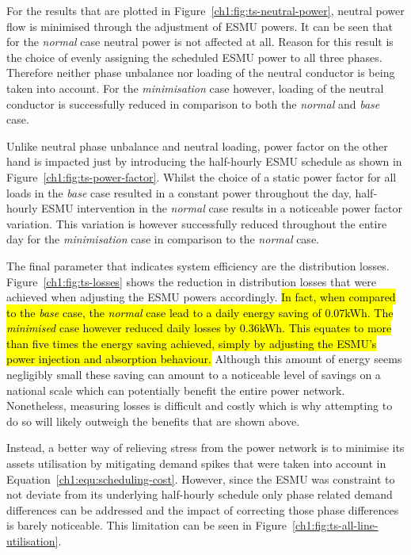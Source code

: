 

For the results that are plotted in Figure~\ref{ch1:fig:ts-neutral-power}, neutral power flow is minimised through the adjustment of ESMU powers.
It can be seen that for the \textit{normal} case neutral power is not affected at all.
Reason for this result is the choice of evenly assigning the scheduled ESMU power to all three phases.
Therefore neither phase unbalance nor loading of the neutral conductor is being taken into account.
For the \textit{minimisation} case however, loading of the neutral conductor is successfully reduced in comparison to both the \textit{normal} and \textit{base} case.



Unlike neutral phase unbalance and neutral loading, power factor on the other hand is impacted just by introducing the half-hourly ESMU schedule as shown in Figure~\ref{ch1:fig:ts-power-factor}.
Whilst the choice of a static power factor for all loads in the \textit{base} case resulted in a constant power throughout the day, half-hourly ESMU intervention in the \textit{normal} case results in a noticeable power factor variation.
This variation is however successfully reduced throughout the entire day for the \textit{minimisation} case in comparison to the \textit{normal} case.



The final parameter that indicates system efficiency are the distribution losses.
Figure~\ref{ch1:fig:ts-losses} shows the reduction in distribution losses that were achieved when adjusting the ESMU powers accordingly.
\hl{In fact, when compared to the \textit{base} case, the \textit{normal} case lead to a daily energy saving of 0.07kWh.
The \textit{minimised} case however reduced daily losses by 0.36kWh.
This equates to more than five times the energy saving achieved, simply by adjusting the ESMU's power injection and absorption behaviour.}
Although this amount of energy seems negligibly small these saving can amount to a noticeable level of savings on a national scale which can potentially benefit the entire power network.
Nonetheless, measuring losses is difficult and costly which is why attempting to do so will likely outweigh the benefits that are shown above.

Instead, a better way of relieving stress from the power network is to minimise its assets utilisation by mitigating demand spikes that were taken into account in Equation~\ref{ch1:equ:scheduling-cost}.
However, since the ESMU was constraint to not deviate from its underlying half-hourly schedule only phase related demand differences can be addressed and the impact of correcting those phase differences is barely noticeable.
This limitation can be seen in Figure~\ref{ch1:fig:ts-all-line-utilisation}.

